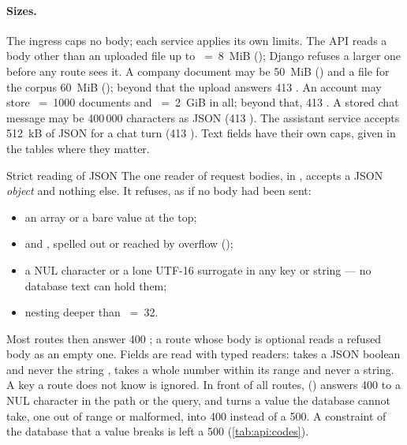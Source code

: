 \paragraph{Sizes.} The ingress caps no body; each service applies its own limits. The API
reads a body other than an uploaded file up to ~=~8~MiB
(); Django refuses a larger one before any route sees it. A company
document may be 50~MiB () and a file for the corpus 60~MiB
(); beyond that the upload answers 413 . An account
may store ~=~1000 documents and ~=~2~GiB in
all; beyond that, 413 . A stored chat message may be 400\,000 characters
as JSON (413 ). The assistant service accepts 512~kB of JSON for a chat
turn (413 ). Text fields have their own caps, given in the tables where
they matter.

\begin{codebox}{Strict reading of JSON}
The one reader of request bodies,  in , accepts a
JSON \emph{object} and nothing else. It refuses, as if no body had been sent:
\begin{itemize}
  \item an array or a bare value at the top;
  \item {} and , spelled out or reached by overflow ();
  \item a NUL character or a lone UTF-16 surrogate in any key or string --- no database text
    can hold them;
  \item nesting deeper than ~=~32.
\end{itemize}
Most routes then answer 400 ; a route whose body is optional reads a refused
body as an empty one. Fields are read with typed readers:  takes a JSON
boolean and never the string ,  takes a whole number within its
range and never a string. A key a route does not know is ignored. In front of all routes,
 () answers 400  to a
NUL character in the path or the query, and turns a value the database cannot take, one out
of range or malformed, into 400
 instead of a 500. A constraint of the database that a value breaks is
left a 500 (\cref{tab:api:codes}).
\end{codebox}



